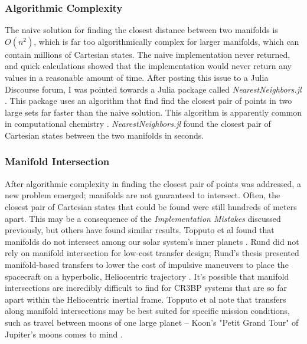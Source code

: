 \documentclass[conf]{new-aiaa}
\begin{document}
\begin{multicols*}{2}
\subsubsection*{Algorithmic Complexity}
The naive solution for finding the closest distance between two 
manifolds is $O(n^2)$, which is far too algorithmically complex 
for larger manifolds, which can contain millions of Cartesian states.
The naive implementation never returned, and quick calculations showed
that the implementation would never return any values in a reasonable
amount of time. After posting this issue to a Julia Discourse forum,
I was pointed towards a Julia package called \textit{NearestNeighbors.jl}
\cite{discourse2021} \cite{nearestNeighbors}. This package uses an 
algorithm that find find the closest pair of points in two 
large sets far faster than the naive solution. This algorithm
is apparently common in computational chemistry \cite{discourse2021}.
\textit{NearestNeighbors.jl} found the closest pair of Cartesian
states between the two manifolds in seconds. 

\subsubsection*{Manifold Intersection}
After algorithmic complexity in finding the closest pair of points was 
addressed, a new problem emerged; manifolds are not guaranteed to intersect. 
Often, the closest pair of Cartesian states that could be found were still 
hundreds of meters apart. This may be a consequence of the \textit{Implementation
Mistakes} discussed previously, but others have found similar results. 
Topputo et al found that manifolds do not intersect among our solar system's
inner planets \cite{topputo2005low}. Rund did not rely on manifold 
intersection for low-cost transfer design; Rund's thesis presented 
manifold-based transfers to lower the cost of impulsive maneuvers
to place the spacecraft on a hyperbolic, Heliocentric trajectory 
\cite{rund2018interplanetary}. It's possible that manifold intersections
are incredibly difficult to find for CR3BP systems that are so far 
apart within the Heliocentric inertial frame. Topputo et al note
that transfers along manifold intersections may be best suited for specific 
mission conditions, such as travel between moons of one large planet --
Koon's "Petit Grand Tour" of Jupiter's moons comes to mind 
\cite{topputo2005low} \cite{koon2008dynamical}.


\end{multicols*}
\end{document}

